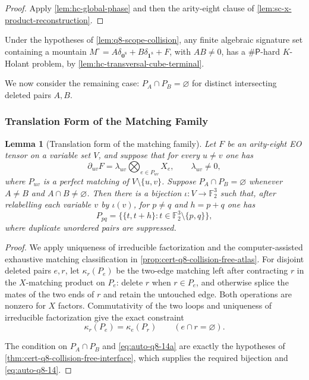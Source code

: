 \documentclass[11pt,letterpaper,onecolumn]{article}
\theoremstyle{plain}
\newtheorem{lemma}[lemma]{Lemma}
\theoremstyle{definition}
\theoremstyle{remark}
\newcommand{\Ftwo}{\mathbb F_2}
\newcommand{\SharpP}{\#\mathsf P}
\newcommand{\one}{\mathbf 1}
\newcommand{\zero}{\mathbf 0}
\begin{document}
	\begin{proof}
		Apply \cref{lem:hc-global-phase} and then the arity-eight clause of
		\cref{lem:sc-x-product-reconstruction}.
	\end{proof}

Under the hypotheses of \cref{lem:q8-scope-collision}, any finite
		algebraic signature set containing a mountain
		\(M^\circ=A\delta_{\zero^8}+B\delta_{\one^8}+F\), with \(AB\ne0\),
		has a \(\SharpP\)-hard \(K\)-Holant problem, by
		\cref{lem:hc-transversal-cube-terminal}.
	
	

We now consider the remaining case: \(P_A\cap P_B=\varnothing\) for
distinct intersecting deleted pairs \(A,B\).

	\subsubsection{Translation Form of the Matching Family}
	
	\begin{lemma}[Translation form of the matching family]
		\label{lem:q8-collision-free-atlas}
		Let \(F\) be an arity-eight EO tensor on a variable set \(V\), and suppose
		that for every \(u\ne v\) one has
		\[
		\partial_{uv}F
		=\lambda_{uv}\bigotimes_{e\in P_{uv}}X_e,
		\qquad \lambda_{uv}\ne0,
		\]
		where \(P_{uv}\) is a perfect matching of \(V\setminus\{u,v\}\).
		Suppose \(P_A\cap P_B=\varnothing\) whenever \(A\ne B\) and
		\(A\cap B\ne\varnothing\).  Then there is a bijection
		\(\iota:V\to\Ftwo^3\) such that, after relabelling each variable \(v\) by
		\(\iota(v)\), for $p\ne q$ and $h=p+q$ one has
		\begin{equation}
		P_{pq}
		=\bigl\{\{t,t+h\}:t\in \Ftwo^3\setminus\{p,q\}\bigr\},
		\label{eq:auto-q8-14}
		\end{equation}
		where duplicate unordered pairs are suppressed.
	\end{lemma}
	
	\begin{proof}
		We apply uniqueness of irreducible factorization and the
		computer-assisted exhaustive matching classification in
		\cref{prop:cert-q8-collision-free-atlas}.  For disjoint deleted pairs
		$e,r$, let $\kappa_r(P_e)$ be the two-edge matching left after contracting
		$r$ in the $X$-matching product on $P_e$: delete $r$ when $r\in P_e$, and
		otherwise splice the mates of the two ends of $r$ and retain the untouched
		edge.  Both operations are nonzero for $X$ factors.  Commutativity of the
		two loops and uniqueness of irreducible factorization give the exact constraint
		\begin{equation}
		\kappa_r(P_e)=\kappa_e(P_r)
		\qquad(e\cap r=\varnothing).
		\label{eq:auto-q8-14a}
		\end{equation}
		
		The condition on \(P_A\cap P_B\) and \eqref{eq:auto-q8-14a} are exactly the
		hypotheses of \cref{thm:cert-q8-collision-free-interface}, which supplies
        the required bijection and \eqref{eq:auto-q8-14}.
	\end{proof}
	
\end{document}
